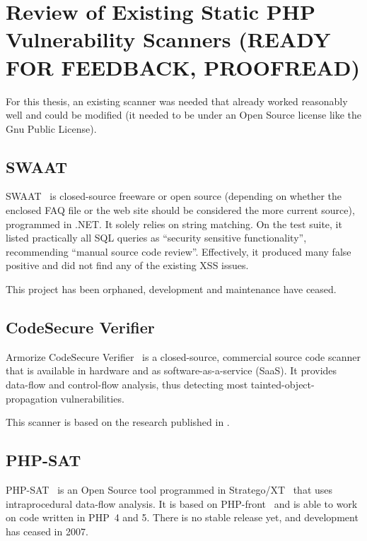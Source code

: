 \chapter{Review of Existing Static PHP Vulnerability Scanners (READY FOR FEEDBACK, PROOFREAD)}
\label{scanners}

For this thesis, an existing scanner was needed that already worked reasonably well and could be modified (\ie it needed to be under an Open Source license like the Gnu Public License).



\section{SWAAT}
\label{swaat}
SWAAT~\cite{swaat} is closed-source freeware or open source (depending on whether the enclosed FAQ file or the web site should be considered the more current source), programmed in .NET. It solely relies on string matching. On the test suite, it listed practically all SQL queries as ``security sensitive functionality'', recommending ``manual source code review''. Effectively, it produced many false positive and did not find any of the existing XSS issues.

This project has been orphaned, \ie development and maintenance have ceased.

\section{CodeSecure Verifier}
\label{armorize}
Armorize CodeSecure Verifier~\cite{codesecure, verifier} is a closed-source, commercial source code scanner that is available in hardware and as software-as-a-service (SaaS). It provides data-flow and control-flow analysis, thus detecting most tainted-object-propagation vulnerabilities.

This scanner is based on the research published in \cite{huang-securing}.

\section{PHP-SAT}
\label{php-sat}
PHP-SAT~\cite{php-sat} is an Open Source tool programmed in Stratego/XT~\cite{stratego} that uses intraprocedural data-flow analysis. It is based on PHP-front~\cite{php-front} and is able to work on code written in PHP~4 and 5. There is no stable release yet, and development has ceased in 2007.

